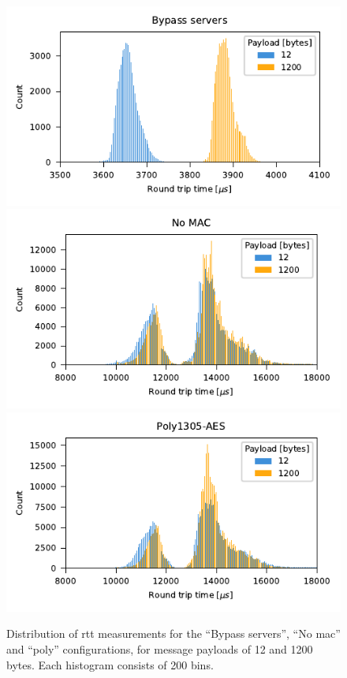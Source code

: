 \begin{figure} \centering
    \includegraphics[width=0.6\linewidth]{figures/rtt-distribution-no-proxy.pdf}
    \includegraphics[width=0.6\linewidth]{figures/rtt-distribution-no-mac.pdf}
    \includegraphics[width=0.6\linewidth]{figures/rtt-distribution-poly1305.pdf} \caption{
        Distribution of \acrshort{rtt} measurements for the ``Bypass servers'', ``No
\acrshort{mac}'' and ``\acrshort{poly}'' configurations, for message payloads of \num{12} and
\num{1200} bytes. Each histogram consists of 200 bins. } \label{fig:rtt-count} \end{figure}
